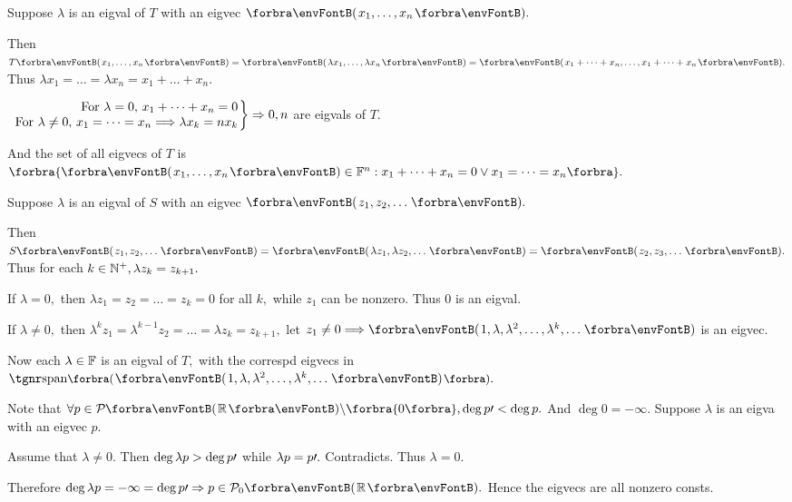 \documentclass[a4paper, 11pt, UTF8]{article}
\begin{document}
\begin{large}
\par\quad
Suppose $\lambda$ is an eigval of $T$ with an eigvec $\Par{x_1,\dots,x_n}.$\par\quad
Then $T\Par{x_1,\dots,x_n}=\Par{\lambda x_1,\dots,\lambda x_n}=\Par{x_1+\dots+x_n,\dots,x_1+\dots+x_n}.$ Thus $\lambda x_1=\dots=\lambda x_n=x_1+\dots+x_n.$\par\quad
\!\!$\hMath{r}{\left.}{\right\}}{$
	For $\lambda=0,$ $x_1+\dots+x_n=0\\$
	For $\lambda\neq 0,$ $x_1=\dots=x_n\Longrightarrow\lambda x_k=n x_k}\Rightarrow0,n$ are eigvals of $T.$\par\quad
And the set of all eigvecs of $T$ is $\Bra{\Par{x_1,\dots,x_n}\in\Fbb^n:x_1+\dots+x_n=0\vee x_1=\dots=x_n}.$\PfEnd
\SepLine

\par\quad
Suppose $\lambda$ is an eigval of $S$ with an eigvec $\Par{z_1,z_2,\dots}.$\par\quad
Then $S\Par{z_1,z_2,\dots}=\Par{\lambda z_1,\lambda z_2,\dots}=\Par{z_2,z_3,\dots}.$ Thus for each $k\in{\mathbb{N}^+},\lambda z_k=z_{k+1}.$\par\quad
If $\lambda=0,$ then $\lambda z_1=z_2=\dots=z_k=0$ for all $k,$ while $z_1$ can be nonzero. Thus $0$ is an eigval.\par\quad
If $\lambda\neq 0,$ then $\lambda^k z_1=\lambda^{k-1} z_2=\dots=\lambda z_k=z_{k+1},$ let $z_1\neq 0\Longrightarrow\Par{1,\lambda,\lambda^2,\dots,\lambda^k,\dots}$ is an eigvec.\par\quad
Now each $\lambda\in{\mathbb{F}}$ is an eigval of $T,$ with the correspd eigvecs in $\Span[\BigPar]{\Par{1,\lambda,\lambda^2,\dots,\lambda^k,\dots}}.$\PfEnd
\SepLine

\par\quad
Note that $\forall p\in\PoR{}\backslash\zeroSubs,\deg p\apostrophe<\deg p.$ And $\deg 0=-\infty.$ Suppose $\lambda$ is an eigva with an eigvec $p.$\par\quad
Assume that $\lambda\neq 0.$ Then $\deg\lambda p>\deg p\prime$ while $\lambda p=p\prime.$ Contradicts. Thus $\lambda=0.$\par\quad
Therefore $\deg \lambda p=-\infty=\deg p\apostrophe\Rightarrow p\in\PoR{0}.$ Hence the eigvecs are all nonzero consts.\PfEnd
\SepLine


\end{large}
\end{document}
